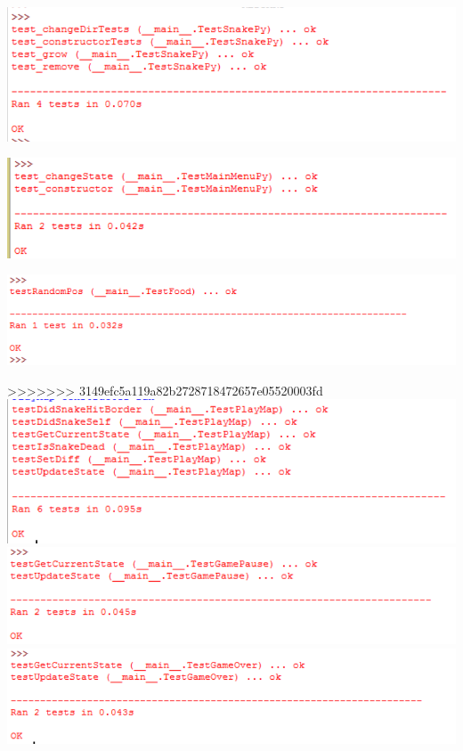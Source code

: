 \documentclass[12pt]{article}
\begin{document}
\includegraphics{testSnakeResults}\newline\newline

\includegraphics{testMainMenuResults}\newline\newline


\includegraphics{testFoodResults}\newline\newline

>>>>>>> 3149efc5a119a82b2728718472657e05520003fd
\includegraphics{testPlayMapResults}\newline\newline
\includegraphics{testGamePauseResults}\newline\newline
\includegraphics{testGameOverResults}\newline\newline
\end{document}
